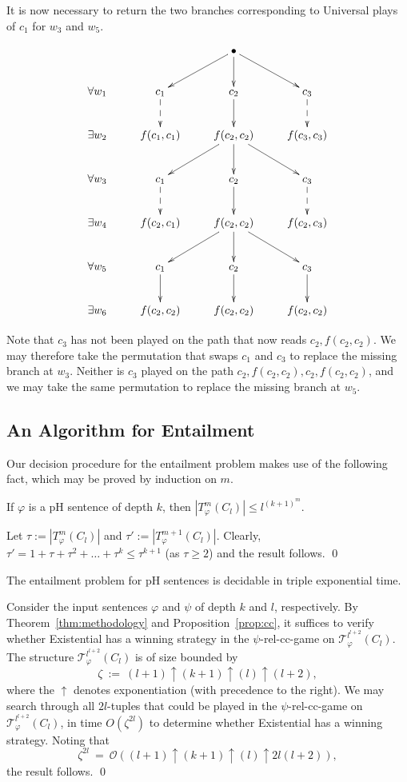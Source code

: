 \documentclass{LMCS}
\begin{document}
\noindent It is now necessary to return the two branches corresponding to Universal plays of $c_1$ for $w_3$ and $w_5$.

\[
\xymatrix{
 & & \bullet \ar[dl] \ar[d] \ar[dr] & \\
\forall w_1 & c_1 \ar@{-->}[d] & c_2 \ar[d] & c_3 \ar@{-->}[d]  \\
\exists w_2 & f(c_1,c_1) & f(c_2,c_2)  \ar[dl] \ar[d] \ar[dr]  & f(c_3,c_3)  \\
\forall w_3 & c_1 \ar@{-->}[d] & c_2 \ar[d] & c_3 \ar@{-->}[d]  \\
\exists w_4 & f(c_2,c_1) & f(c_2,c_2) \ar[dl] \ar[d] \ar[dr] & f(c_2,c_3)  \\
\forall w_5 & c_1 \ar[d] & c_2 \ar[d] & c_3 \ar[d]  \\
\exists w_6 & f(c_2,c_2) & f(c_2,c_2) & f(c_2,c_2) \\
}
\]
 \medskip

\noindent Note that $c_3$ has not been played on the path that now reads $c_2,f(c_2,c_2)$. We may therefore take the permutation that swaps $c_1$ and $c_3$ to replace the missing branch at $w_3$. Neither is $c_3$ played on the path $c_2,f(c_2,c_2),c_2,f(c_2,c_2)$, and we may take the same permutation to replace the missing branch at $w_5$.


\subsection{An Algorithm for Entailment}
\label{LHS:sec:alg}

Our decision procedure for the entailment problem makes use of the following fact, which may be proved by induction on $m$.
\begin{fact}
\label{fact2}
If $\varphi$ is a pH sentence of depth $k$, then $|T^m_\varphi(C_l)| \leq l^{(k+1)^m}$.
\end{fact}
\proof
Let $\tau:=|T^m_\varphi(C_l)|$ and $\tau':=|T^{m+1}_\varphi(C_l)|$. Clearly, $\tau'=1+\tau+\tau^2+\ldots+\tau^k \leq \tau^{k+1}$ (as $\tau\geq 2$) and the result follows.
\qed

\begin{thm}
The entailment problem for pH sentences is decidable in triple exponential time.
\end{thm}
\proof
Consider the input sentences $\varphi$ and $\psi$ of depth $k$ and $l$, respectively. By Theorem~\ref{thm:methodology} and Proposition~\ref{prop:cc}, it suffices to verify whether Existential has a winning strategy in the $\psi$-rel-cc-game on $\mathcal{T}^{l^{l+2}}_\varphi(C_l)$. The structure $\mathcal{T}^{l^{l+2}}_\varphi(C_l)$ is of size bounded by
\[ \zeta \ := \ (l+1) \uparrow (k+1) \uparrow (l) \uparrow (l+2),\]
where the $\uparrow$ denotes exponentiation (with precedence to the right).
We may search through all $2l$-tuples that could be played in the $\psi$-rel-cc-game on $\mathcal{T}^{l^{l+2}}_\varphi(C_l)$, in time $O(\zeta^{2l})$ to determine whether Existential has a winning strategy. Noting that
\[ \zeta^{2l} \ = \ \mathcal{O} ( (l+1) \uparrow (k+1) \uparrow (l) \uparrow 2l(l+2)), \]
the result follows.
\qed
\end{document}
